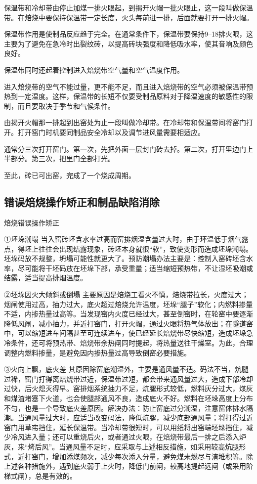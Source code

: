\documentclass{ctexbook}
\begin{document}
保温带和冷却带由停止加煤一排火眼起，到揭开火帽一批火眼止，这一段叫做保温带。在焙烧中要保持保温带一定长度，火头每前进一排，后面就要打开一排火帽。

保温带作用是使制品反应趋于完全。在通常条件下，保温带要保持9--18排火眼，这主要为了避免在急冷时出裂纹砖，以提高砖块强度和降低吸水率，使其音响及颜色良好。

保温带同时还起着控制进入焙烧带空气量和空气温度作用。

进入焙烧带的空气不能过量，更不能不足，而且进入焙烧带的空气必须被保温带预热到一定温度。这样，保温带的长短不仅要受制品原料对于降温速度的敏感性的限制，而且要取决于季节和气候条件。

由揭开火帽那一排起到出窑处为止一段叫做冷却带。在冷却带和保温带间将窑门打开。打开窑门时机要同制品安全冷却以及调节进风量需要相适应。

通常分三次打开窑门。第一次，先把外面一层封门砖去掉。第二次，打开里边门上半部分。第三次，把里门全部打光。

至此，砖已可出窑，完成了一个烧成周期。
\subsection{错误焙烧操作矫正和制品缺陷消除}
焙烧错误操作矫正

①坯垛潮塌 当入窑砖坯含水率过高而窑排烟湿含量过大时，由于环温低于烟气露点，得坯上往往会出现结露现象，砖坯本身就很“软”，致使变形而造成坯垛潮塌。坯垛码放不规整，坍塌可能性就更大了。预防潮塌办法主要是：控制入窑砖坯含水率，尽可能将干坯码放在坯垛下部，承受重量；适当缩短预热带，不让湿坯吸潮或结露，适当提高排烟温度。

②坯垛因火大倾斜或倒塌 主要原因是焙烧工看火不慎，焙烧带拉长，火度过大；烟闸使用过高，抽力过大，底火超过焙烧允许温度，坯垛“腿子”软化；内燃料掺量不适，内掺热量过高等。当发现窑内火度已经过大，甚至倒窑时，在轮窑中要逐渐降低风闸，减小抽力，并近打窑门，打开火帽，通过火眼将热气体放出；在隧道窑中，可以缩短进车间隔甚至可连续进车，使已经延长焙烧带尽快缩短，造成坯垛急冷条件，还可将预热带、焙烧带余热闸同时提起，将热量送往干燥室。为此，合理调整内燃料掺量，是避免因内掺热量过高导致倒窑必要措施。

③火向上飘，底火差 其原因除窑底潮湿外，主要是通风量不适。码法不当，炕腿过稀，窑门打得离焙烧带过近，保温带过短，都会带来通风量过大，造成下部冷却过快，后火熄灭得早。窑排烟系统抽力不足，炕腿形式较低，燃料灰分过大，煤灰和煤渣堵塞下火道，也会使腿部通风不良，造成底火不好。燃料在坯垛高度上分布不匀，也是一个导致底火差原因。解决办法：防止窑底过分潮湿，注意窑体排水隔潮。当通风量过大时，应适当改变码法，降低炕腿，减少底部通风量；将打得过近窑门用草帘挡住，延长保温带。当冷却带很短时，可以用纸将出窑端坯垛挡住，减少冷风进入量；还可以重烧后火，或者通过火眼，在焙烧带最后一排之后添入炉灰，来“烤后风”。当通风量不足时，应采取与上述相反措施，如采用较高炕腿形式，近打窑门，增加添煤频次，减少每次添入分量，避免煤未燃尽与渣堆积等。除上述各种措施外，遇到底火弱于上火时，降低门前闸，较高地提起远闸（或采用阶梯式闸），总是有效的。
\end{document}
